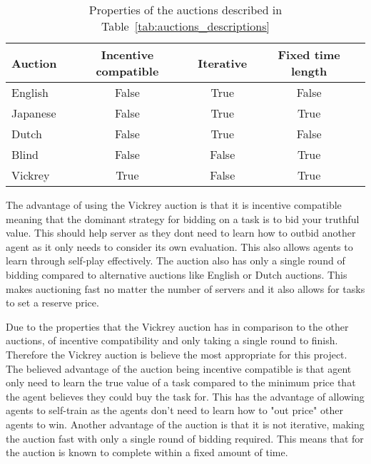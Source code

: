 \begin{table}[h]
    \centering
    \begin{tabular}{|l|c|c|c|} \hline
        Auction  & Incentive compatible & Iterative & Fixed time length\\ \hline
        English  & False                & True      & False            \\ \hline
        Japanese & False                & True      & True             \\ \hline
        Dutch    & False                & True      & False            \\ \hline
        Blind    & False                & False     & True             \\ \hline
        Vickrey  & True                 & False     & True             \\ \hline
    \end{tabular}
    \caption{Properties of the auctions described in Table~\ref{tab:auctions_descriptions}}
    \label{tab:auction_properties}
\end{table}

The advantage of using the Vickrey auction is that it is incentive
compatible meaning that the dominant strategy for bidding on a task is to bid your truthful value. This should help
server as they dont need to learn how to outbid another agent as it only needs to consider its own evaluation.
This also allows agents to learn through self-play effectively. The auction also has only a single round of bidding
compared to alternative auctions like English or Dutch auctions. This makes auctioning fast no matter the number of
servers and it also allows for tasks to set a reserve price.

Due to the properties that the Vickrey auction has in comparison to the other auctions, of incentive compatibility and
only taking a single round to finish. Therefore the Vickrey auction is believe the most appropriate for this project. The
believed advantage of the auction being incentive compatible is that agent only need to learn the true value of a task
compared to the minimum price that the agent believes they could buy the task for. This has the advantage of allowing
agents to self-train as the agents don't need to learn how to "out price" other agents to win. Another advantage of the auction
is that it is not iterative, making the auction fast with only a single round of bidding required. This means that for the auction
is known to complete within a fixed amount of time.

